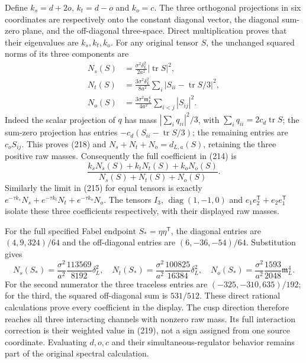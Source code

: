 \documentclass[11pt]{article}
\begin{document}
Define $k_s=d+2o$, $k_t=d-o$ and $k_o=c$. The three orthogonal
projections in six coordinates are respectively onto the constant
diagonal vector, the diagonal sum-zero plane, and the off-diagonal
three-space. Direct multiplication proves that their eigenvalues
are $k_s,k_t,k_o$. For any original tensor $S$, the unchanged squared
norms of its three components are
\begin{align}
 N_s(S)&=\frac{\sigma^2\delta_L^2}{2a^2}|\operatorname{tr}S|^2,\nonumber\\
 N_t(S)&=\frac{3\sigma^2\delta_L^2}{8a^2}
                 \sum_i|S_{ii}-\operatorname{tr}S/3|^2,\nonumber\\
 N_o(S)&=\frac{3\sigma^2\mathfrak m_L^4}{4a^2}
                 \sum_{i<j}|S_{ij}|^2.
 \label{eq:band-channel-masses}
\end{align}
Indeed the scalar projection of $q$ has mass
$|\sum_iq_{ii}|^2/3$, with $\sum_iq_{ii}=2c_d\operatorname{tr}S$;
the sum-zero projection has entries
$-c_d(S_{ii}-\operatorname{tr}S/3)$; the remaining entries
are $c_oS_{ij}$. This proves (218) and
$N_s+N_t+N_o=d_{L,a}(S)$, retaining the three positive raw masses.
Consequently the full coefficient in (214) is
\begin{equation}\label{eq:band-channel-correction}
 \frac{k_sN_s(S)+k_tN_t(S)+k_oN_o(S)}{N_s(S)+N_t(S)+N_o(S)}.
\end{equation}
Similarly the limit in (215) for equal tensors
is exactly $e^{-\tau k_s}N_s+e^{-\tau k_t}N_t+e^{-\tau k_o}N_o$.
The tensors $I_3$, $\operatorname{diag}(1,-1,0)$ and
$e_1e_2^{\mathsf T}+e_2e_1^{\mathsf T}$ isolate these three
coefficients respectively, with their displayed raw masses.

For the full specified Fabel endpoint $S_*=\eta\eta^{\mathsf T}$,
the diagonal entries are $(4,9,324)/64$ and the off-diagonal
entries are $(6,-36,-54)/64$. Substitution gives
\begin{equation}\label{eq:band-Fabel-channel-masses}
 N_s(S_*)=\frac{\sigma^2}{a^2}\frac{113569}{8192}\delta_L^2,
 \quad N_t(S_*)=\frac{\sigma^2}{a^2}\frac{100825}{16384}\delta_L^2,
 \quad N_o(S_*)=\frac{\sigma^2}{a^2}\frac{1593}{2048}\mathfrak m_L^4.
\end{equation}
For the second numerator the three traceless entries are
$(-325,-310,635)/192$; for the third, the squared off-diagonal
sum is $531/512$. These direct rational calculations prove every
coefficient in the display. The cusp direction therefore reaches
all three interacting channels with nonzero raw mass. Its full
interaction correction is their weighted value in
(219), not a sign assigned from one
source coordinate. Evaluating $d,o,c$ and their simultaneous-regulator
behavior remains part of the original spectral calculation.
\end{document}
